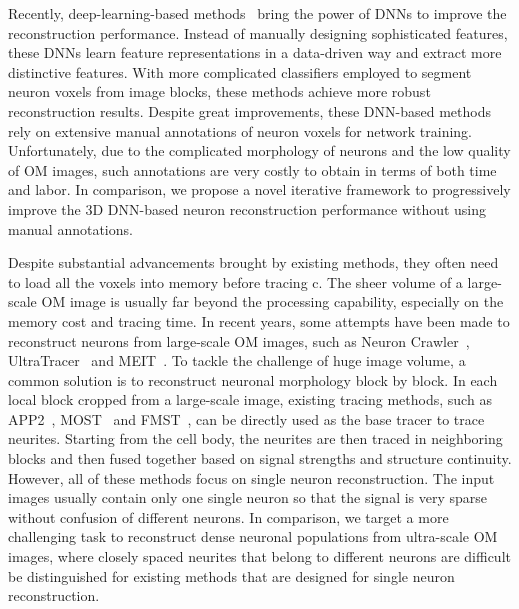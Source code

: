 Recently, deep-learning-based methods~\cite{Li2017, Zhou2018, Xu2016,Kozinski-MIA2020} bring the power of DNNs to improve the reconstruction performance. 
Instead of manually designing sophisticated features, these DNNs learn feature representations in a data-driven way and extract more distinctive features. 
With more complicated classifiers employed to segment neuron voxels from image blocks, these methods achieve more robust reconstruction results. 
Despite great improvements, these DNN-based methods rely on extensive manual annotations of neuron voxels for network training.
Unfortunately, due to the complicated morphology of neurons and the low quality of OM images, such annotations are very costly to obtain in terms of both time and labor.
%
In comparison, we propose a novel iterative framework to progressively improve the 3D DNN-based neuron reconstruction performance without using manual annotations.



Despite substantial advancements brought by existing methods, they often need to load all the voxels into memory before tracing c.
The sheer volume of a large-scale OM image is usually far beyond the processing capability, especially on the memory cost and tracing time.
%
In recent years, some attempts have been made to reconstruct neurons from large-scale OM images, such as Neuron Crawler~\cite{Zhou2015}, UltraTracer~\cite{Peng2017} and MEIT~\cite{Wang2018}.
To tackle the challenge of huge image volume, a common solution is to reconstruct neuronal morphology block by block. 
In each local block cropped from a large-scale image, existing tracing methods, such as APP2~\cite{Xiao2013}, MOST~\cite{Wu2014} and FMST~\cite{Yang2019}, can be directly used as the base tracer to trace neurites. 
Starting from the cell body, the neurites are then traced in neighboring blocks and then fused together based on signal strengths and structure continuity.
%
However, all of these methods focus on single neuron reconstruction.
The input images usually contain only one single neuron so that the signal is very sparse without confusion of different neurons. 
%
In comparison, we target a more challenging task to reconstruct dense neuronal populations from ultra-scale OM images, where closely spaced neurites that belong to different neurons are difficult be distinguished for existing methods that are designed for single neuron reconstruction.

